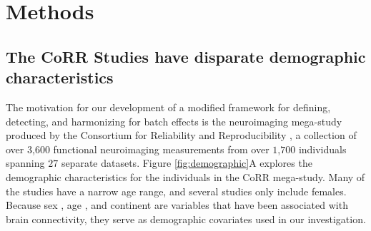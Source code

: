 \section{Methods}
\label{sec:methods}

\subsection{The CoRR Studies have disparate demographic characteristics}
\label{sec:demo}
The motivation for our development of a modified framework for defining, detecting, and harmonizing for batch effects is the neuroimaging mega-study produced by the Consortium for Reliability and Reproducibility \cite{corr}, a collection of over $3$,$600$ functional neuroimaging measurements from over $1$,$700$ individuals spanning $27$ separate datasets. Figure \ref{fig:demographic}A  explores the demographic characteristics for the individuals in the CoRR mega-study. Many of the studies have a narrow age range, and several studies only include females. Because sex \cite{Weis2020Mar,Ingalhalikar2014Jan,Satterthwaite2015Sep}, age \cite{Varangis2019,Sala-Llonch2015,Hampson2012Sep}, and continent \cite{Misiura2020,JianqiaoGe2023Jan} are variables that have been associated with brain connectivity, they serve as demographic covariates used in our investigation.

